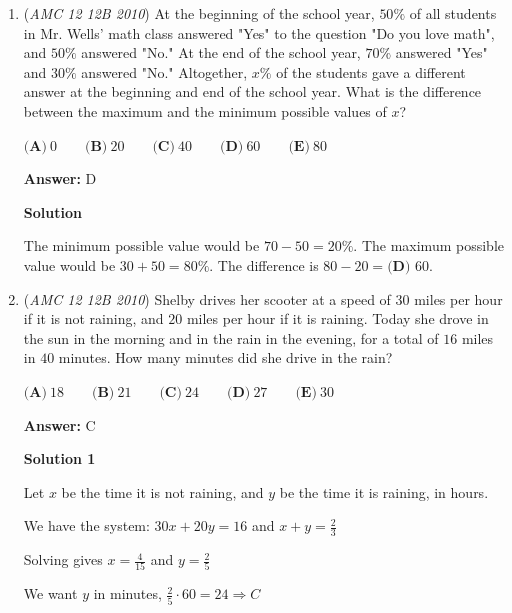 \begin{enumerate}
 \textbf{Answer: }D



\textbf{Solution}

We simply plug in the numbers
 \[1 - 2 - 3 - 4 + e = 1 - (2 - (3 - (4 + e)))\]
 \[-8 + e = -2 - e\]
 \[2e = 6\]
 \[e = 3 \;\;(D)\]



	\item (\textit{AMC 12 12B 2010}) At the beginning of the school year, $50\%$ of all students in Mr. Wells' math class answered "Yes" to the question "Do you love math", and $50\%$ answered "No." At the end of the school year, $70\%$ answered "Yes" and $30\%$ answered "No." Altogether, $x\%$ of the students gave a different answer at the beginning and end of the school year. What is the difference between the maximum and the minimum possible values of $x$?


 $\textbf{(A)}\ 0 \qquad \textbf{(B)}\ 20 \qquad \textbf{(C)}\ 40 \qquad \textbf{(D)}\ 60 \qquad \textbf{(E)}\ 80$

 \textbf{Answer: }D



\textbf{Solution}

The minimum possible value would be $70 - 50 = 20\%$. The maximum possible value would be $30 + 50 = 80\%$. The difference is $80 - 20 = \boxed{\textbf{(D) }60}$.

 


	\item (\textit{AMC 12 12B 2010}) Shelby drives her scooter at a speed of $30$ miles per hour if it is not raining, and $20$ miles per hour if it is raining. Today she drove in the sun in the morning and in the rain in the evening, for a total of $16$ miles in $40$ minutes. How many minutes did she drive in the rain?


 $\textbf{(A)}\ 18 \qquad \textbf{(B)}\ 21 \qquad \textbf{(C)}\ 24 \qquad \textbf{(D)}\ 27 \qquad \textbf{(E)}\ 30$

 \textbf{Answer: }C



\textbf{Solution 1}

Let $x$ be the time it is not raining, and $y$ be the time it is raining, in hours.

 We have the system: $30x+20y=16$ and $x+y=\frac{2}{3}$

 Solving gives $x=\frac{4}{15}$ and $y=\frac{2}{5}$

 We want $y$ in minutes, $\frac{2}{5} \cdot 60=24 \Rightarrow C$





\end{enumerate}
